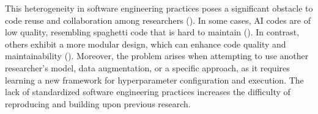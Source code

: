 
This heterogeneity in software engineering practices poses a significant obstacle to code reuse and collaboration among researchers (\cite{davis2011understandingmodularity}). In some cases, AI codes are of low quality, resembling spaghetti code that is hard to maintain (\cite{seAIsurvey,martinez2022softwareAI,amershi2019software,mainatiblity,leakage-recrisis,gezici2022systematicsoftware}). In contrast, others exhibit a more modular design, which can enhance code quality and maintainability (\cite{seAIsurvey,martinez2022softwareAI,wan2019does}). Moreover, the problem arises when attempting to use another researcher's model, data augmentation, or a specific approach, as it requires learning a new framework for hyperparameter configuration and execution. The lack of standardized software engineering practices increases the difficulty of reproducing and building upon previous research.



